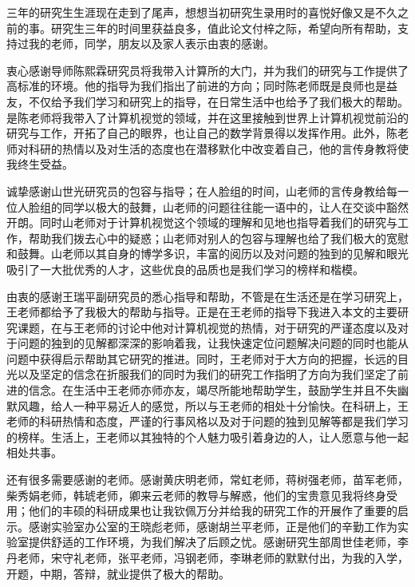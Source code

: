 
\begin{ack}
三年的研究生生涯现在走到了尾声，想想当初研究生录用时的喜悦好像又是不久之前的事。研究生三年的时间里获益良多，值此论文付梓之际，希望向所有帮助，支持过我的老师，同学，朋友以及家人表示由衷的感谢。

衷心感谢导师陈熙霖研究员将我带入计算所的大门，并为我们的研究与工作提供了高标准的环境。他的指导为我们指出了前进的方向；同时陈老师既是良师也是益友，不仅给予我们学习和研究上的指导，在日常生活中也给予了我们极大的帮助。是陈老师将我带入了计算机视觉的领域，并在这里接触到世界上计算机视觉前沿的研究与工作，开拓了自己的眼界，也让自己的数学背景得以发挥作用。此外，陈老师对科研的热情以及对生活的态度也在潜移默化中改变着自己，他的言传身教将使我终生受益。

诚挚感谢山世光研究员的包容与指导；在人脸组的时间，山老师的言传身教给每一位人脸组的同学以极大的鼓舞，山老师的问题往往能一语中的，让人在交谈中豁然开朗。同时山老师对于计算机视觉这个领域的理解和见地也指导着我们的研究与工作，帮助我们拨去心中的疑惑；山老师对别人的包容与理解也给了我们极大的宽慰和鼓舞。山老师以其自身的博学多识，丰富的阅历以及对问题的独到的见解和眼光吸引了一大批优秀的人才，这些优良的品质也是我们学习的榜样和楷模。

由衷的感谢王瑞平副研究员的悉心指导和帮助，不管是在生活还是在学习研究上，王老师都给予了我极大的帮助与指导。正是在王老师的指导下我进入本文的主要研究课题，在与王老师的讨论中他对计算机视觉的热情，对于研究的严谨态度以及对于问题的独到的见解都深深的影响着我，让我快速定位问题解决问题的同时也能从问题中获得启示帮助其它研究的推进。同时，王老师对于大方向的把握，长远的目光以及坚定的信念在折服我们的同时为我们的研究工作指明了方向为我们坚定了前进的信念。在生活中王老师亦师亦友，竭尽所能地帮助学生，鼓励学生并且不失幽默风趣，给人一种平易近人的感觉，所以与王老师的相处十分愉快。在科研上，王老师的科研热情和态度，严谨的行事风格以及对于问题的独到见解等都是我们学习的榜样。生活上，王老师以其独特的个人魅力吸引着身边的人，让人愿意与他一起相处共事。

还有很多需要感谢的老师。感谢黄庆明老师，常虹老师，蒋树强老师，苗军老师，柴秀娟老师，韩琥老师，卿来云老师的教导与解惑，他们的宝贵意见我将终身受用；他们的丰硕的科研成果也让我钦佩万分并给我的研究工作的开展作了重要的启示。感谢实验室办公室的王晓彪老师，感谢胡兰平老师，正是他们的辛勤工作为实验室提供舒适的工作环境，为我们解决了后顾之忧。感谢研究生部周世佳老师，李丹老师，宋守礼老师，张平老师，冯钢老师，李琳老师的默默付出，为我的入学，开题，中期，答辩，就业提供了极大的帮助。


\end{ack}
